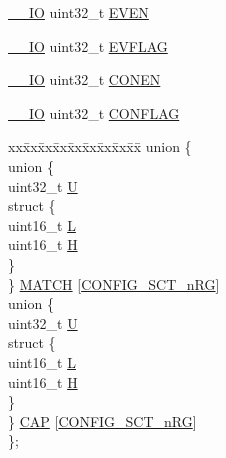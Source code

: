 \begin{DoxyCompactItemize}
\hyperlink{core__sc300_8h_aec43007d9998a0a0e01faede4133d6be}{\+\_\+\+\_\+\+IO} uint32\+\_\+t \hyperlink{struct_l_p_c___s_c_t___t_ae792bceba5bde97d28b81d914a3445c7}{E\+V\+EN}
\item 
\hyperlink{core__sc300_8h_aec43007d9998a0a0e01faede4133d6be}{\+\_\+\+\_\+\+IO} uint32\+\_\+t \hyperlink{struct_l_p_c___s_c_t___t_a00c615ad4f37d931241886f1be3352a1}{E\+V\+F\+L\+AG}
\item 
\hyperlink{core__sc300_8h_aec43007d9998a0a0e01faede4133d6be}{\+\_\+\+\_\+\+IO} uint32\+\_\+t \hyperlink{struct_l_p_c___s_c_t___t_a23f3acc7f5070e187e550137ab864ce4}{C\+O\+N\+EN}
\item 
\hyperlink{core__sc300_8h_aec43007d9998a0a0e01faede4133d6be}{\+\_\+\+\_\+\+IO} uint32\+\_\+t \hyperlink{struct_l_p_c___s_c_t___t_aa05f575798ff3629dc2629479f54324d}{C\+O\+N\+F\+L\+AG}
\item 
\begin{tabbing}
xx\=xx\=xx\=xx\=xx\=xx\=xx\=xx\=xx\=\kill
union \{\\
\>union \{\\
\>\>uint32\_t \hyperlink{struct_l_p_c___s_c_t___t_aa12d7d1d2c95315549032b6e19db5d03}{U}\\
\>\>struct \{\\
\>\>\>uint16\_t \hyperlink{struct_l_p_c___s_c_t___t_aa5ab268b51e8f1f09f30dfb58369b22a}{L}\\
\>\>\>uint16\_t \hyperlink{struct_l_p_c___s_c_t___t_a38e1d5c4c9e43fb6422619272bff5838}{H}\\
\>\>\} \\
\>\} \hyperlink{struct_l_p_c___s_c_t___t_a0614558ab1766ffce8611f74f095e79b}{MATCH} \mbox{[}\hyperlink{group___s_c_t__18_x_x__43_x_x_ga8d80e251208a01483a6b00c81ecb7493}{CONFIG\_SCT\_nRG}\mbox{]}\\
\>union \{\\
\>\>uint32\_t \hyperlink{struct_l_p_c___s_c_t___t_aa12d7d1d2c95315549032b6e19db5d03}{U}\\
\>\>struct \{\\
\>\>\>uint16\_t \hyperlink{struct_l_p_c___s_c_t___t_aa5ab268b51e8f1f09f30dfb58369b22a}{L}\\
\>\>\>uint16\_t \hyperlink{struct_l_p_c___s_c_t___t_a38e1d5c4c9e43fb6422619272bff5838}{H}\\
\>\>\} \\
\>\} \hyperlink{struct_l_p_c___s_c_t___t_a92757236fb3dba48ecfd8f81c3250db5}{CAP} \mbox{[}\hyperlink{group___s_c_t__18_x_x__43_x_x_ga8d80e251208a01483a6b00c81ecb7493}{CONFIG\_SCT\_nRG}\mbox{]}\\
\}; \\


\end{tabbing}
\end{DoxyCompactItemize}
